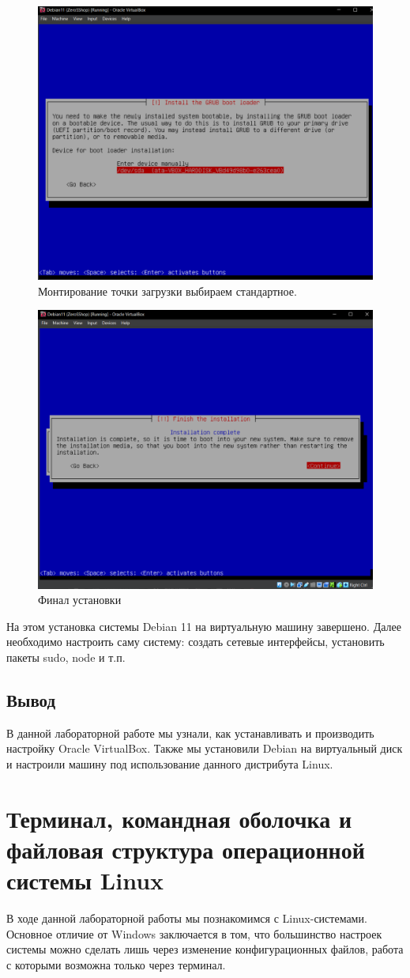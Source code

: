 \begin{figure}[h!]
    \centering
    \includegraphics[width=0.3\linewidth]{Pic/lab4/Вставленное изображение (39).png}
    \caption{Монтирование точки загрузки выбираем стандартное.}
    \label{fig:enter-label}
\end{figure}

\begin{figure}[h!]
    \centering
    \includegraphics[width=0.3\linewidth]{Pic/lab4/Вставленное изображение (40).png}
    \caption{Финал установки}
    \label{fig:enter-label}
\end{figure}
\newpage
На этом установка системы Debian 11 на виртуальную машину завершено. Далее необходимо настроить саму систему: создать сетевые интерфейсы, установить пакеты sudo, node и т.п. 
\newpage
\subsection{Вывод}

В данной лабораторной работе мы узнали, как устанавливать и производить настройку Oracle VirtualBox. Также мы установили Debian на виртуальный диск и настроили машину под использование данного дистрибута Linux. 
\newpage

\section{Терминал, командная оболочка и файловая структура операционной системы Linux}

В ходе данной лабораторной работы мы познакомимся с Linux-системами. Основное отличие от Windows заключается в том, что большинство настроек системы можно сделать лишь через изменение конфигурационных файлов, работа с которыми возможна только через терминал.

